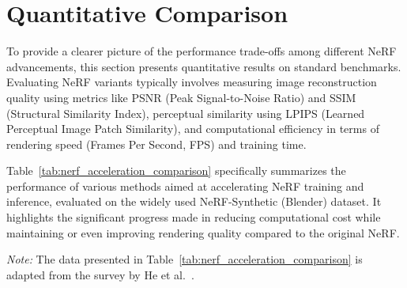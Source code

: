 

\section{Quantitative Comparison}
\label{sec:quantitative_comparison} %

To provide a clearer picture of the performance trade-offs among different NeRF advancements, this section presents quantitative results on standard benchmarks. Evaluating NeRF variants typically involves measuring image reconstruction quality using metrics like PSNR (Peak Signal-to-Noise Ratio) and SSIM (Structural Similarity Index), perceptual similarity using LPIPS (Learned Perceptual Image Patch Similarity), and computational efficiency in terms of rendering speed (Frames Per Second, FPS) and training time.

Table~\ref{tab:nerf_acceleration_comparison} specifically summarizes the performance of various methods aimed at accelerating NeRF training and inference, evaluated on the widely used NeRF-Synthetic (Blender) dataset. It highlights the significant progress made in reducing computational cost while maintaining or even improving rendering quality compared to the original NeRF.

\textit{Note:} The data presented in Table~\ref{tab:nerf_acceleration_comparison} is adapted from the survey by He et al.~\cite{He2024Progress}.



